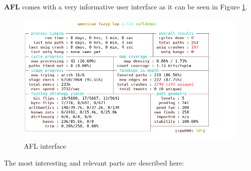 \documentclass[../main.tex]{subfiles}
\begin{document}
\textbf{AFL} comes with a very informative user interface as it can be seen in Figure \ref{fig:aflint}.

\begin{figure}[htp]
  \centering
  \hspace*{0.6cm}
  \vspace*{0.6cm}
  \includegraphics[scale=0.7]{images/afl-test_x86_64-white.png}
  \caption{AFL interface}
  \label{fig:aflint}
\end{figure}

The most interesting and relevant parts are described here:
\end{document}
